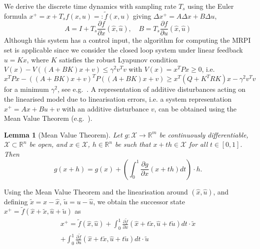 \documentclass[letterpaper, 10pt, conference]{ieeeconf} %
\newtheorem{thm}{Lemma}[section]
\begin{document}
We derive the discrete time dynamics with sampling rate $T_s$ using
the Euler formula $x^+=x+T_s f(x,u) =:\tilde f(x,u)$ giving $\Delta x^+ = A \Delta x + B \Delta u$,
\[
A = I+T_s\frac{\partial f}{\partial  x}(\hat
  x,\hat u) , \quad
B = T_s \frac{\partial f}{\partial u}(\hat x,\hat u)
\]
Although this system has a control input, the algorithm for computing the
MRPI set is applicable since we consider the closed loop system under
linear feedback  $u=Kx$, where $K$ satisfies the robust Lyapunov condition $V(x)-V((A+BK)x+v)\leq \gamma^2v^Tv$ 
with $V(x)=x^T P x\geq0$, i.e. $x^TPx - ((A+BK)x+v)^TP((A+BK)x+v)\geq x^T(Q+K^TRK)x -\gamma^2 v^Tv$
for a minimum  $\gamma^2$, see e.g.~\cite{Boyd:94}.
A representation of additive disturbances acting on the linearised
model due to linearisation errors, i.e. a system representation $x^+=Ax + Bu + v$ with an additive disturbance $v$, can be obtained using the
Mean Value Theorem 
(e.g.~\cite{Apostol:1974}).
%
%
\begin{thm}[Mean Value Theorem]\label{thm:mean:value:theorem}
Let $g : \mathcal X \rightarrow\mathbb R^m$ be continuously
differentiable, $\mathcal X\subset\mathbb R^n$ be open,
and $x \in\mathcal X$, $h \in\mathbb R^n$ be such that 
$x + th \in\mathcal X$ for all $t\in [0 ,1]$. Then
\begin{equation}
	g(x+h) = g(x) + \left(\int_0^1 \frac{\partial g}{\partial x}(x+th)dt\right)\cdot h.
\end{equation}
\end{thm}
%
%
Using the Mean Value Theorem
and the linearisation around $(\hat{x},\hat{u})$, and defining 
$\tilde{x} = x - \hat{x}$, $\tilde{u} = u - \hat{u}$, we obtain the successor state $x^+ = \tilde{f}(\hat{x} + \tilde{x},\hat{u} + \tilde{u})$ as
%
\begin{multline*}
x^+= \tilde f(\hat x, \hat u) 
+ \int_0^1\frac{\partial\tilde f}{\partial x}(\hat x + t\tilde x,
\hat u + t\tilde u) dt \cdot \tilde x  \\
+ \int_0^1\frac{\partial\tilde f}{\partial u}(\hat x + t\tilde x,\hat u+
t\tilde{u}) dt\cdot \tilde{u}
\end{multline*}
\end{document}
